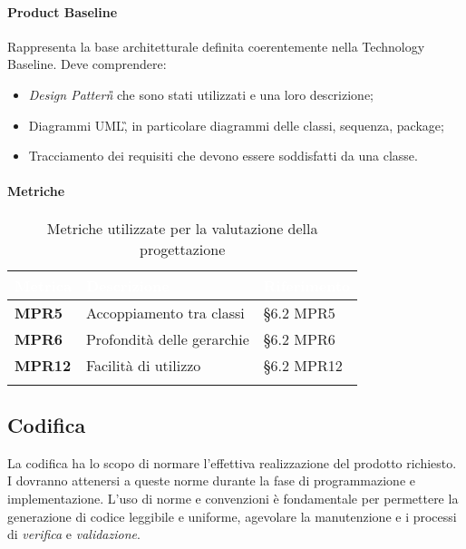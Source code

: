 \paragraph{Product Baseline}
Rappresenta la base architetturale definita coerentemente nella Technology Baseline. Deve comprendere:
\begin{itemize}
	\item {\textit{Design Pattern\G{}}} che sono stati utilizzati e una loro descrizione;
	\item Diagrammi UML\G, in particolare diagrammi delle classi, sequenza, package;
	\item Tracciamento dei requisiti che devono essere soddisfatti da una classe.
\end{itemize}

\paragraph{Metriche}
\setlength{\freewidth}{\dimexpr\textwidth-0\tabcolsep}
\renewcommand{\arraystretch}{1.5}
\setlength{\aboverulesep}{0pt}
\setlength{\belowrulesep}{0pt}
\begin{longtable}{L{.22\freewidth} L{.4\freewidth} L{.2\freewidth}}
	\toprule
	\textcolor{white}{\textbf{Metrica}}&
	\textcolor{white}{\textbf{Descrizione}}&	
	\textcolor{white}{\textbf{Riferimento}}\\	
	\toprule
	\endhead
	
	\textbf{MPR5} & Accoppiamento tra classi & \S 6.2 MPR5 \\
	\textbf{MPR6} & Profondità delle gerarchie & \S 6.2 MPR6 \\
	\textbf{MPR12} & Facilità di utilizzo & \S 6.2 MPR12 \\
	
	\bottomrule
	\caption*{Metriche utilizzate per la valutazione della progettazione}
\end{longtable}

\subsection{Codifica} %
La codifica ha lo scopo di normare l'effettiva realizzazione del prodotto richiesto. I \progrs{} dovranno attenersi a queste norme durante la fase di programmazione e implementazione.
L'uso di norme e convenzioni è fondamentale per permettere la generazione di codice leggibile e uniforme, agevolare la manutenzione e i processi di \emph{verifica} e \emph{validazione}.


